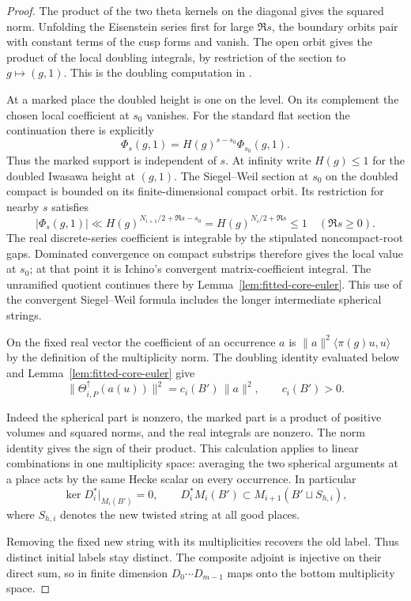 \begin{proof}
 The product of the two theta
kernels on the diagonal gives the squared norm. Unfolding the
Eisenstein series first for large \(\Re s\), the boundary orbits pair
with constant terms of the cusp forms and vanish. The open orbit gives
the product of the local doubling integrals, by restriction of the
section to \(g\mapsto(g,1)\). This is the doubling computation in
\cite[Sections 11.3--11.5]{gqt-rallis}.

At a marked place the doubled height is one on the level. On its
complement the chosen local coefficient at \(s_0\) vanishes.
For the standard flat section the continuation there is explicitly
\[
       \Phi_s(g,1)=H(g)^{s-s_0}\Phi_{s_0}(g,1).
\]
Thus the marked support is independent of \(s\). At infinity write
\(H(g)\le1\) for the doubled Iwasawa height at \((g,1)\). 
The Siegel--Weil section at \(s_0\) on the doubled compact is bounded on
its finite-dimensional compact orbit. Its restriction for nearby
\(s\) satisfies
\[
        |\Phi_s(g,1)|\ll H(g)^{N_{i+1}/2+\Re s-s_0}
            =H(g)^{N_i/2+\Re s}\le1\quad(\Re s\ge0).
\]
The real discrete-series coefficient is integrable by the stipulated
noncompact-root gaps. Dominated convergence on compact substrips
therefore gives the local value at \(s_0\); at that point it is
Ichino's convergent matrix-coefficient integral. The unramified
quotient continues there by Lemma~\ref{lem:fitted-core-euler}.
This use of the convergent Siegel--Weil formula includes the longer
intermediate spherical strings.

On the fixed real vector the coefficient of an
occurrence \(a\) is \(\|a\|^2\langle\pi(g)u,u\rangle\) by the
definition of the multiplicity norm. The doubling identity evaluated below and Lemma~\ref{lem:fitted-core-euler} give
\[
 \|\Theta^\uparrow_{i,P}(a(u))\|^2
       =c_i(B')\,\|a\|^2,\qquad c_i(B')>0 .
\]

Indeed the spherical part is nonzero, the marked part is a product
of positive volumes and squared norms, and the real integrals are
nonzero. The norm identity gives the sign of their product. This
calculation applies to linear combinations in one multiplicity space:
averaging the two spherical arguments at a place acts by the same
Hecke scalar on every occurrence. In particular
\[
   \ker D_i^*|_{M_i(B')}=0,\qquad
   D_i^* M_i(B')\subset M_{i+1}(B'\sqcup S_{h,i}),
\]
where \(S_{h,i}\) denotes the new twisted string at all good places.

Removing the fixed new string with its multiplicities recovers the old label. Thus distinct initial labels
stay distinct. The composite adjoint is injective on their direct sum,
so in finite dimension \(D_0\cdots D_{m-1}\) maps onto the bottom
multiplicity space.


\end{proof}
